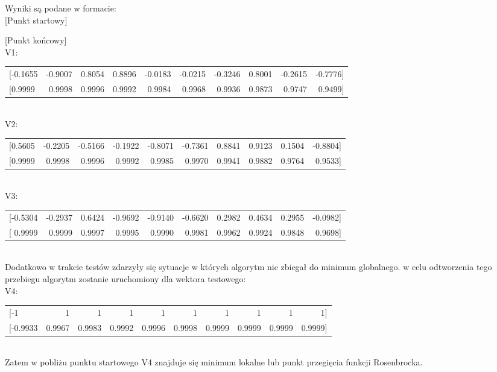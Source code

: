 \documentclass[12pt]{article}
\begin{document}
Wyniki są podane w formacie:\\

[Punkt startowy]

[Punkt końcowy]\\

V1:\\

\begin{tabular}{lrrrrrrrrr}
     [-0.1655 &  -0.9007  &  0.8054 &   0.8896 &  -0.0183  & -0.0215  & -0.3246  
     & 0.8001 &  -0.2615 &  -0.7776]\\
    
     [0.9999  &  0.9998  &  0.9996   & 0.9992   & 0.9984  &  0.9968  &  0.9936 
     & 0.9873  &  0.9747   & 0.9499]\\
\end{tabular}\\

V2:\\

\begin{tabular}{lrrrrrrrrr}
     [0.5605 &  -0.2205 &  -0.5166 &  -0.1922 &  -0.8071  & -0.7361  &  0.8841  
     & 0.9123  &  0.1504  & -0.8804]\\
    
     [0.9999  &  0.9998 &  0.9996  &  0.9992  &  0.9985  &  0.9970  &  0.9941  
     & 0.9882   & 0.9764  &  0.9533]\\
\end{tabular}\\

V3:\\

\begin{tabular}{lrrrrrrrrr}
     [-0.5304  & -0.2937  &  0.6424  & -0.9692  & -0.9140  &-0.6620 &   0.2982  
     & 0.4634  &  0.2955 &  -0.0982]\\
    
     [ 0.9999  &  0.9999   & 0.9997   & 0.9995 &   0.9990  &  0.9981  &  0.9962 
     & 0.9924  &  0.9848   & 0.9698]\\
\end{tabular}\\

Dodatkowo w trakcie testów zdarzyły się sytuacje w których algorytm nie zbiegał
do minimum globalnego. w celu odtworzenia tego przebiegu algorytm zostanie
uruchomiony dla wektora testowego:\\

V4:\\

\begin{tabular}{lrrrrrrrrr}
     [-1  & 1  &  1  & 1  & 1  & 1 &   1  
     & 1  &  1 &  1]\\
     
     [-0.9933   & 0.9967  &  0.9983  &  0.9992  &  0.9996  &  0.9998   & 0.9999 
     & 0.9999  &  0.9999  &  0.9999]\\
 \end{tabular}\\

Zatem w pobliżu punktu startowego V4 znajduje się minimum lokalne lub punkt
przegięcia funkcji Rosenbrocka.
\end{document}
